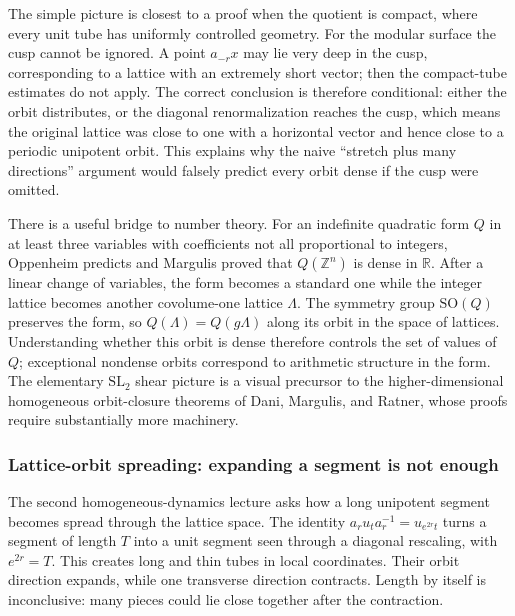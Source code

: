 The simple picture is closest to a proof when the quotient is compact, where every unit tube has uniformly controlled geometry. For the modular surface the cusp cannot be ignored. A point \(a_{-r}x\) may lie very deep in the cusp, corresponding to a lattice with an extremely short vector; then the compact-tube estimates do not apply. The correct conclusion is therefore conditional: either the orbit distributes, or the diagonal renormalization reaches the cusp, which means the original lattice was close to one with a horizontal vector and hence close to a periodic unipotent orbit. This explains why the naive ``stretch plus many directions'' argument would falsely predict every orbit dense if the cusp were omitted.

There is a useful bridge to number theory. For an indefinite quadratic form \(Q\) in at least three variables with coefficients not all proportional to integers, Oppenheim predicts and Margulis proved that \(Q(\mathbb Z^n)\) is dense in \(\mathbb R\). After a linear change of variables, the form becomes a standard one while the integer lattice becomes another covolume-one lattice \(\Lambda\). The symmetry group \(\mathrm{SO}(Q)\) preserves the form, so \(Q(\Lambda)=Q(g\Lambda)\) along its orbit in the space of lattices. Understanding whether this orbit is dense therefore controls the set of values of \(Q\); exceptional nondense orbits correspond to arithmetic structure in the form. The elementary \(\mathrm{SL}_2\) shear picture is a visual precursor to the higher-dimensional homogeneous orbit-closure theorems of Dani, Margulis, and Ratner, whose proofs require substantially more machinery.

\subsubsection{Lattice-orbit spreading: expanding a segment is not enough}\label{04-visual-computing-ii-ch033-lattice-orbit-spreading-expanding-a-segment-is-not-enough}

\hypertarget{04-visual-computing-ii-ch033-lattice-orbit-spreading-expanding-a-segment-is-not-enough}{}

The second homogeneous-dynamics lecture asks how a long unipotent segment becomes spread through the lattice space. The identity \(a_r u_t a_r^{-1}=u_{e^{2r}t}\) turns a segment of length \(T\) into a unit segment seen through a diagonal rescaling, with \(e^{2r}=T\). This creates long and thin tubes in local coordinates. Their orbit direction expands, while one transverse direction contracts. Length by itself is inconclusive: many pieces could lie close together after the contraction.

